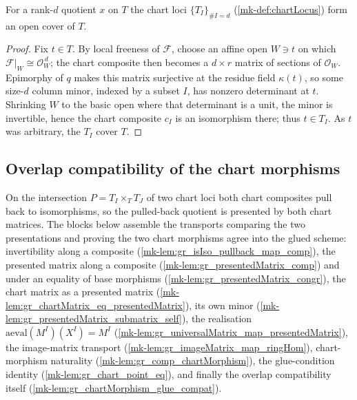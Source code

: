 \begin{lemma}\label{mk-lem:chartLocus_isOpenCover}
  \leanok

  For a rank-\(d\) quotient \(x\) on \(T\) the chart loci \(\{T_I\}_{\#I = d}\)
  (\ref{mk-def:chartLocus}) form an open cover of \(T\).
\end{lemma}
\begin{proof}
  Fix \(t \in T\). By local freeness of \(\mathcal{F}\), choose an affine open \(W \ni t\) on
  which \(\mathcal{F}|_W \cong \mathcal{O}_W^{\,d}\); the chart composite then becomes a
  \(d\times r\) matrix of sections of \(\mathcal{O}_W\). Epimorphy of \(q\) makes this matrix
  surjective at the residue field \(\kappa(t)\), so some size-\(d\) column minor, indexed by a
  subset \(I\), has nonzero determinant at \(t\). Shrinking \(W\) to the basic open where that
  determinant is a unit, the minor is invertible, hence the chart composite \(c_I\) is an
  isomorphism there; thus \(t \in T_I\). As \(t\) was arbitrary, the \(T_I\) cover \(T\).
\end{proof}


\subsection{Overlap compatibility of the chart morphisms}

On the intersection \(P = T_I \times_T T_J\) of two chart loci both chart composites pull
back to isomorphisms, so the pulled-back quotient is presented by both chart matrices. The
blocks below assemble the transports comparing the two presentations and proving the two
chart morphisms agree into the glued scheme: invertibility along a composite
(\ref{mk-lem:gr_isIso_pullback_map_comp}), the presented matrix along a composite
(\ref{mk-lem:gr_presentedMatrix_comp}) and under an equality of base morphisms
(\ref{mk-lem:gr_presentedMatrix_congr}), the chart matrix as a presented matrix
(\ref{mk-lem:gr_chartMatrix_eq_presentedMatrix}), its own minor
(\ref{mk-lem:gr_presentedMatrix_submatrix_self}), the realisation
\(\mathrm{aeval}(M^I)(X^I) = M^I\) (\ref{mk-lem:gr_universalMatrix_map_presentedMatrix}), the
image-matrix transport (\ref{mk-lem:gr_imageMatrix_map_ringHom}), chart-morphism naturality
(\ref{mk-lem:gr_comp_chartMorphism}), the glue-condition identity
(\ref{mk-lem:gr_chart_point_eq}), and finally the overlap compatibility itself
(\ref{mk-lem:gr_chartMorphism_glue_compat}).

